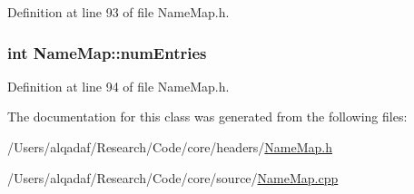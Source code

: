 Definition at line 93 of file NameMap.h.

\hypertarget{class_name_map_a647caae861e8a9e8472a033da6c0ad20}{
\subsubsection[{numEntries}]{\setlength{\rightskip}{0pt plus 5cm}int {\bf NameMap::numEntries}}}
\label{class_name_map_a647caae861e8a9e8472a033da6c0ad20}


Definition at line 94 of file NameMap.h.



The documentation for this class was generated from the following files:\begin{DoxyCompactItemize}
\item 
/Users/alqadaf/Research/Code/core/headers/\hyperlink{_name_map_8h}{NameMap.h}\item 
/Users/alqadaf/Research/Code/core/source/\hyperlink{_name_map_8cpp}{NameMap.cpp}\end{DoxyCompactItemize}
